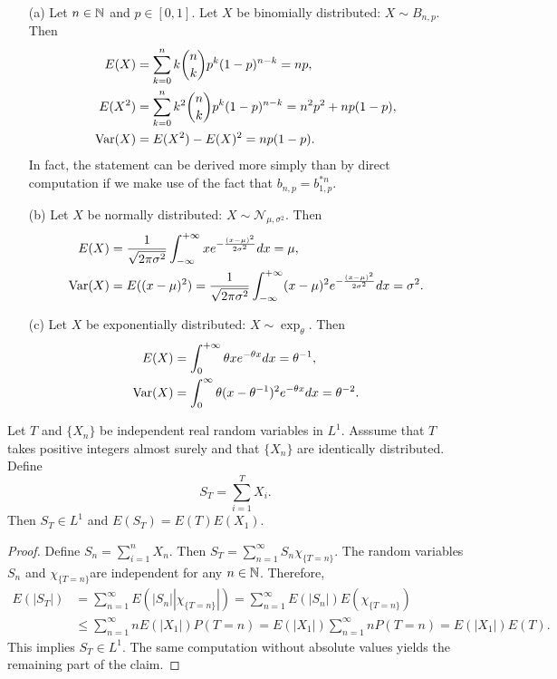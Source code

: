\begin{example}
\mbox{}
\begin{itemize}
\item[(a)] Let $n\in\mathbb{N}$ and $p\in[0,1]$. Let $X$ be binomially distributed: $X\sim B_{n,p}$. Then
\begin{align*}
E(X)&=\sum_{k=0}^{n}k\binom{n}{k}p^k(1-p)^{n-k}=np,\\
E(X^2)&=\sum_{k=0}^{n}k^2\binom{n}{k}p^k(1-p)^{n-k}=n^2p^2+np(1-p),\\
\mathrm{Var}(X)&=E(X^2)-E(X)^2=np(1-p).
\end{align*}
In fact, the statement can be derived more simply than by direct computation if we make use of the fact that $b_{n,p}=b^{\ast n}_{1,p}$.
\item[(b)] Let $X$ be normally distributed: $X\sim\mathcal{N}_{\mu,\sigma^2}$. Then
\begin{align*}
E(X)&=\frac{1}{\sqrt{2\pi\sigma^2}}\int_{-\infty}^{+\infty}xe^{-\frac{(x-\mu)^2}{2\sigma^2}}dx=\mu,\\
\mathrm{Var}(X)&=E((x-\mu)^2)=\frac{1}{\sqrt{2\pi\sigma^2}}\int_{-\infty}^{+\infty}(x-\mu)^2e^{-\frac{(x-\mu)^2}{2\sigma^2}}dx=\sigma^2.
\end{align*}
\item[(c)] Let $X$ be exponentially distributed: $X\sim\exp_\theta$. Then
\begin{align*}
E(X)&=\int_{0}^{+\infty}\theta xe^{-\theta x}dx=\theta^{-1},\\
\mathrm{Var}(X)&=\int_{0}^{\infty}\theta(x-\theta^{-1})^2e^{-\theta x}dx=\theta^{-2}.
\end{align*}
\end{itemize}
\end{example}
\begin{theorem}
Let $T$ and $\{X_n\}$ be independent real random variables in $L^1$. Asssume that $T$ takes positive integers almost surely and that $\{X_n\}$ are identically distributed. Define
\[S_T=\sum_{i=1}^{T}X_i.\]
Then $S_T\in L^1$ and $E(S_T)=E(T)E(X_1)$.
\end{theorem}
\begin{proof}
Define $S_n=\sum_{i=1}^{n}X_n$. Then $S_T=\sum_{n=1}^{\infty}S_n\chi_{\{T=n\}}$. The random variables $S_n$ and $\chi_{\{T=n\}}$are independent for any $n\in\mathbb{N}$. Therefore,
\begin{align*}
E(|S_T|)&=\sum_{n=1}^{\infty}E(|S_n||\chi_{\{T=n\}}|)=\sum_{n=1}^{\infty}E(|S_n|)E(\chi_{\{T=n\}})\\
&\leq \sum_{n=1}^{\infty}nE(|X_1|)P(T=n)=E(|X_1|)\sum_{n=1}^{\infty}nP(T=n)=E(|X_1|)E(T).
\end{align*}
This implies $S_T\in L^1$. The same computation without absolute values yields the remaining part of the claim.
\end{proof}
